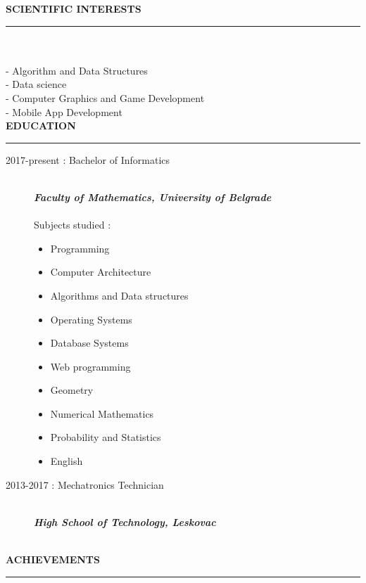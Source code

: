 \documentclass{article}
\begin{document}
\color{my_col}
\textbf{\large SCIENTIFIC INTERESTS}\\
\noindent\rule{15.4cm}{1.6pt}\color{black}\\\\
- Algorithm and Data Structures\\
- Data science \\
- Computer Graphics and Game Development\\
- Mobile App Development\\

\color{my_col}
\textbf{\large EDUCATION}\\
\noindent\rule{15.4cm}{1.6pt}\color{black}
\begin{description}
    \item[ 2017-present : Bachelor of Informatics ]\hfill \\
    \textbf{\textit{Faculty of Mathematics, University of Belgrade}}\\
    \normalsize \\
    Subjects studied :
     \begin{multicols}{2}
    \begin{itemize}
    \item Programming
    \item Computer Architecture
    \item Algorithms and Data structures
    \item Operating Systems
    \item Database Systems
    \item Web programming
    \item Geometry
    \item Numerical Mathematics
    \item Probability and Statistics 
    \item English
    \end{itemize}
    \end{multicols}
\end{description}

\begin{description}
    \item[ 2013-2017 : Mechatronics Technician]\hfill \\
    \textbf{\textit{High School of Technology, Leskovac}}\\
    \normalsize \\
  
\end{description}
\color{my_col}
\textbf{\large ACHIEVEMENTS}\\
\noindent\rule{15.4cm}{1.6pt}\color{black}
\normalsize
\end{document}
